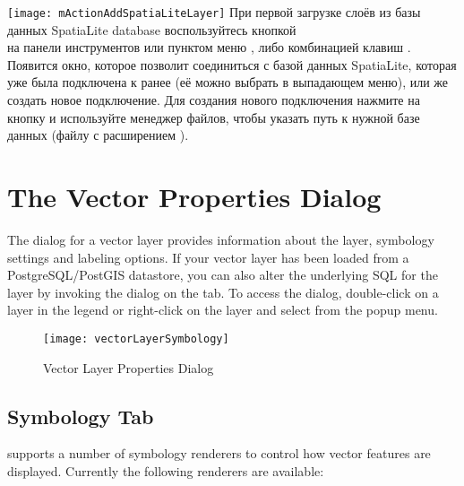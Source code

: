 \texttt{[image: mActionAddSpatiaLiteLayer]}
При первой загрузке слоёв из базы данных SpatiaLite database воспользуйтесь
кнопкой \\
на панели инструментов или пунктом
меню , либо комбинацией клавиш .
Появится окно, которое позволит соединиться с базой данных SpatiaLite,
которая уже была подключена к \qg ранее (её можно выбрать в выпадающем
меню), или же создать новое подключение. Для создания нового подключения
нажмите на кнопку  и используйте менеджер файлов, чтобы
указать путь к нужной базе данных (файлу с расширением ).

\section{The Vector Properties Dialog}\label{sec:vectorprops}

The  dialog for a vector layer provides information
about the layer, symbology settings and labeling options. If your vector
layer has been loaded from a PostgreSQL/PostGIS datastore, you can also alter
the underlying SQL for the layer by invoking the 
dialog on the  tab.
To access the  dialog, double-click on a layer in
the legend or right-click on the layer and select 
from the popup menu.

\begin{figure}[ht]
   \centering
   \texttt{[image: vectorLayerSymbology]}
   \caption{Vector Layer Properties Dialog \nixcaption}\label{fig:vector_symbology}
 \end{figure}

\subsection{Symbology Tab}\label{sec:symbology}

\qg supports a number of symbology renderers to control how
vector features are displayed. Currently the following renderers
are available:

